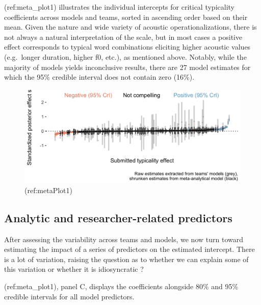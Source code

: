 \documentclass[Review,times,sageh]{sagej}
\begin{document}
(ref:meta\_plot1) illustrates the individual intercepts for critical typicality coefficients across models and teams, sorted in ascending order based on their mean.
Given the nature and wide variety of acoustic operationalizations, there is not always a natural interpretation of the scale, but in most cases a positive effect corresponds to typical word combinations eliciting higher acoustic values (e.g.~longer duration, higher f0, etc.), as mentioned above.
Notably, while the majority of models yields inconclusive results, there are 27 model estimates for which the 95\% credible interval does not contain zero (16\%).

\begin{figure}
\includegraphics[width=1\linewidth]{../figs/meta_plot1_shrinkage} \caption{(ref:metaPlot1)}\label{fig:plot-meta1}
\end{figure}

\hypertarget{analytic-and-researcher-related-predictors}{%
\subsection{Analytic and researcher-related predictors}\label{analytic-and-researcher-related-predictors}}

After assessing the variability across teams and models, we now turn toward estimating the impact of a series of predictors on the estimated intercept.
There is a lot of variation, raising the question as to whether we can explain some of this variation or whether it is idiosyncratic \citep{breznau2021observing}?

(ref:meta\_plot1), panel C, displays the coefficients alongside 80\% and 95\% credible intervals for all model predictors.
\end{document}
